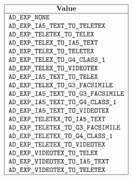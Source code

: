 \[\begin{tabular}{|l|}
\hline
	\multicolumn{1}{|c|}{\bf Value} \\
\hline
	\tt AD\_EXP\_NONE \\
	\tt AD\_EXP\_IA5\_TEXT\_TO\_TELETEX \\
	\tt AD\_EXP\_TELETEX\_TO\_TELEX \\
	\tt AD\_EXP\_TELEX\_TO\_IA5\_TEXT \\
	\tt AD\_EXP\_TELEX\_TO\_TELETEX \\
	\tt AD\_EXP\_TELEX\_TO\_G4\_CLASS\_1 \\


	\tt AD\_EXP\_TELEX\_TO\_VIDEOTEX \\
	\tt AD\_EXP\_IA5\_TEXT\_TO\_TELEX \\
	\tt AD\_EXP\_TELEX\_TO\_G3\_FACSIMILE \\
	\tt AD\_EXP\_IA5\_TEXT\_TO\_G3\_FACSIMILE \\
	\tt AD\_EXP\_IA5\_TEXT\_TO\_G4\_CLASS\_1 \\
	\tt AD\_EXP\_IA5\_TEXT\_TO\_VIDEOTEX \\
	\tt AD\_EXP\_TELETEX\_TO\_IA5\_TEXT \\
	\tt AD\_EXP\_TELETEX\_TO\_G3\_FACSIMILE \\
	\tt AD\_EXP\_TELETEX\_TO\_G4\_CLASS\_1 \\
	\tt AD\_EXP\_TELETEX\_TO\_VIDEOTEX \\
	\tt AD\_EXP\_VIDEOTEX\_TO\_TELEX \\
	\tt AD\_EXP\_VIDEOTEX\_TO\_IA5\_TEXT \\
	\tt AD\_EXP\_VIDEOTEX\_TO\_TELETEX \\
\hline
\end{tabular}\]
